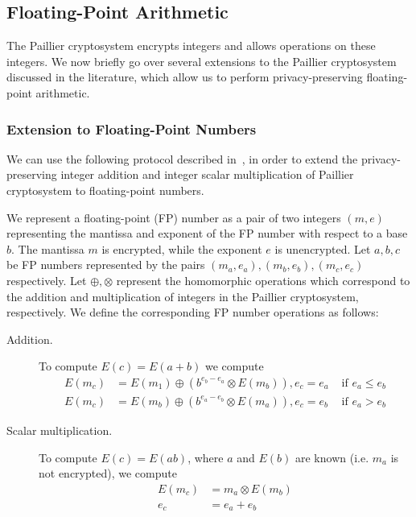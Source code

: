 \subsection{Floating-Point Arithmetic}
\label{sec:fp_operations}
The Paillier cryptosystem encrypts integers and allows operations on these integers. We now briefly go over several extensions to the Paillier cryptosystem discussed in the literature, which allow us to perform privacy-preserving floating-point arithmetic.

\subsubsection{Extension to Floating-Point Numbers}
\label{sec:fp_operations}
We can use the following protocol described in~\cite{ziad_cryptoimg:_2016}, in order to extend the privacy-preserving integer addition and integer scalar multiplication of Paillier cryptosystem to floating-point numbers.

We represent a floating-point (FP) number as a pair of two integers $(m,e)$ representing the mantissa and exponent of the FP number with respect to a base $b$. The mantissa $m$ is encrypted, while the exponent $e$ is unencrypted.
Let $a,b,c$ be FP numbers represented by the pairs $(m_a,e_a),(m_b,e_b),(m_c,e_c)$ respectively. Let $\oplus,\otimes$ represent the homomorphic operations which correspond to the addition and multiplication of integers in the Paillier cryptosystem, respectively. We define the corresponding FP number operations as follows:
\begin{description}
  \item[Addition.]
    To compute $E(c)=E(a+b)$ we compute
    \begin{align*}
      E(m_c) &= E(m_1) \oplus (b^{e_b-e_a} \otimes E(m_b)), e_c = e_a & \text{ if } e_a \leq e_b \\
      E(m_c) &= E(m_b) \oplus (b^{e_a-e_b} \otimes E(m_a)), e_c = e_b & \text{ if } e_a > e_b
    \end{align*}
  \item[Scalar multiplication.]
    To compute $E(c) = E(ab)$, where $a$ and $E(b)$ are known (i.e. $m_a$ is not encrypted), we compute
    \begin{align*}
      E(m_c) &= m_a \otimes E(m_b)\\
      e_c &= e_a + e_b
    \end{align*}
\end{description}
